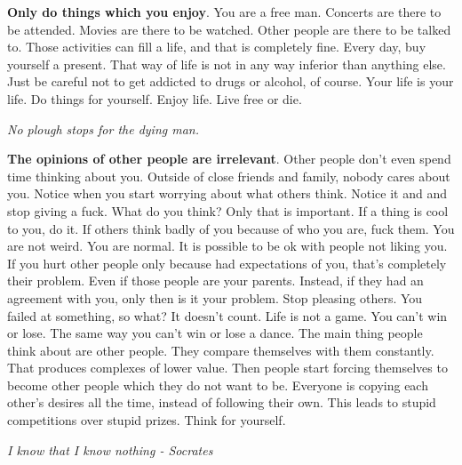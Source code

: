 \documentclass[a4paper,hidelinks]{article}
\begin{document}
\textbf{Only do things which you enjoy}.
You are a free man.
Concerts are there to be attended.
Movies are there to be watched.
Other people are there to be talked to.
Those activities can fill a life, and that is completely fine.
Every day, buy yourself a present.
That way of life is not in any way inferior than anything else.
Just be careful not to get addicted to drugs or alcohol, of course.
Your life is your life.
Do things for yourself.
Enjoy life.
Live free or die.

\newpage

\begin{center}
\textit{
No plough stops for the dying man.
}
\end{center}

\textbf{The opinions of other people are irrelevant}.
Other people don't even spend time thinking about you.
Outside of close friends and family, nobody cares about you.
Notice when you start worrying about what others think.
Notice it and and stop giving a fuck.
What do you think?
Only that is important.
If a thing is cool to you, do it.
If others think badly of you because of who you are, fuck them.
You are not weird.
You are normal.
It is possible to be ok with people not liking you.
If you hurt other people only because had expectations of you, that's completely their problem.
Even if those people are your parents.
Instead, if they had an agreement with you, only then is it your problem.
Stop pleasing others.
You failed at something, so what?
It doesn't count.
Life is not a game.
You can't win or lose.
The same way you can't win or lose a dance.
The main thing people think about are other people.
They compare themselves with them constantly.
That produces complexes of lower value.
Then people start forcing themselves to become other people which they do not want to be.
Everyone is copying each other's desires all the time, instead of following their own.
This leads to stupid competitions over stupid prizes.
Think for yourself.

\newpage

\begin{center}
\textit{
I know that I know nothing - Socrates
}
\end{center}
\end{document}
